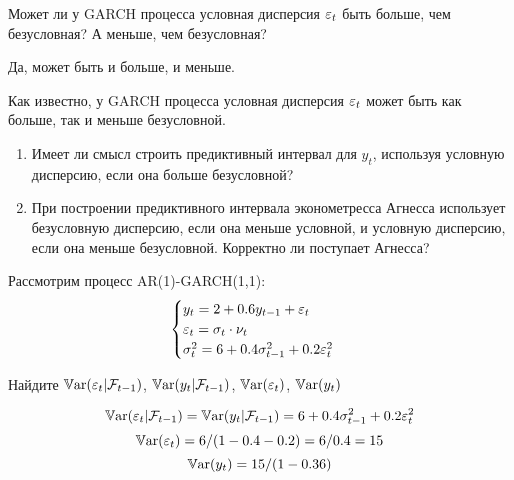 \begin{problem}
Может ли у GARCH процесса условная дисперсия $\varepsilon_t$ быть больше, чем безусловная? А меньше, чем безусловная?
\begin{sol}
Да, может быть и больше, и меньше.
\end{sol}
\end{problem}

\begin{problem}
Как известно, у GARCH процесса условная дисперсия $\varepsilon_t$ может быть как больше, так и меньше безусловной.
\begin{enumerate}
\item Имеет ли смысл строить предиктивный интервал для $y_t$, используя условную дисперсию, если она больше безусловной?
\item При построении предиктивного интервала эконометресса Агнесса использует безусловную дисперсию, если она меньше условной, и условную дисперсию, если она меньше безусловной. Корректно ли поступает Агнесса?
\end{enumerate}
\begin{sol}

\end{sol}
\end{problem}



\begin{problem}
Рассмотрим процесс AR(1)-GARCH(1,1):
\[
\begin{cases}
y_t = 2 + 0.6 y_{t-1} + \varepsilon_t \\
\varepsilon_t = \sigma_t \cdot \nu_t \\
\sigma^2_t = 6 + 0.4 \sigma^2_{t-1} + 0.2\varepsilon_t^2
\end{cases}
\]


Найдите $\mathbb{V}\mathrm{ar}(\varepsilon_t | \mathcal{F}_{t-1})$, $\mathbb{V}\mathrm{ar}(y_t| \mathcal{F}_{t-1})$, $\mathbb{V}\mathrm{ar}(\varepsilon_t)$, $\mathbb{V}\mathrm{ar}(y_t)$


\begin{sol}
\[
\mathbb{V}\mathrm{ar}(\varepsilon_t | \mathcal{F}_{t-1}) = \mathbb{V}\mathrm{ar}(y_t| \mathcal{F}_{t-1}) = 6 + 0.4 \sigma^2_{t-1} + 0.2\varepsilon_t^2
\]
\[
\mathbb{V}\mathrm{ar}(\varepsilon_t) = 6/(1-0.4-0.2)=6/0.4=15
\]
\[
\mathbb{V}\mathrm{ar}(y_t)=15/(1-0.36)
\]
\end{sol}
\end{problem}




